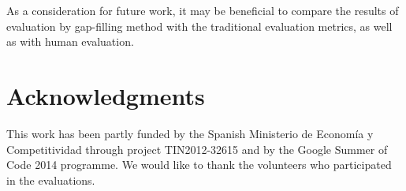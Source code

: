 \documentclass[11pt]{article}
\newcommand{\comment}[1]{}
\begin{document}
As a consideration for future work, it may be beneficial to compare the results of evaluation by gap-filling method with the traditional evaluation metrics, as well as with human evaluation.

\section*{Acknowledgments}

This work has been partly funded by the Spanish Ministerio de Econom{\'i}a y Competitividad through project TIN2012-32615 and by the Google Summer of Code 2014 programme. We would like to thank the volunteers who participated in the evaluations.



\comment{EA: urls do not show up in web citations, how can I fix that?}

\end{document}
